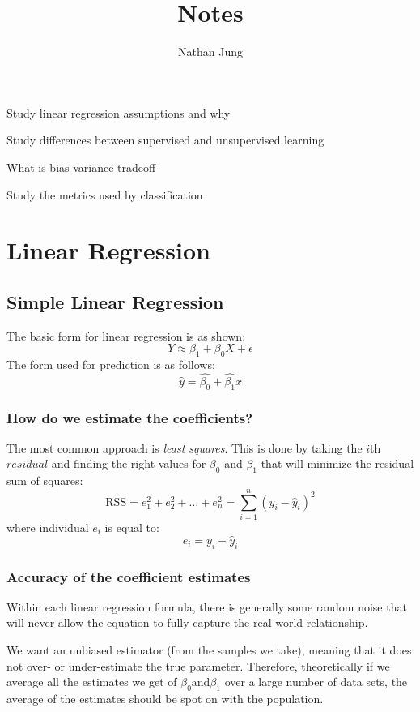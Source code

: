 \documentclass[12pt]{article}
\title{Notes}
\author{Nathan Jung}
\begin{document}
\maketitle

Study linear regression assumptions and why 

Study differences between supervised and unsupervised learning

What is bias-variance tradeoff

Study the metrics used by classification
   


\section{Linear Regression}
\subsection{Simple Linear Regression}
The basic form for linear regression is as shown:
\[ Y \approx  \beta_1 + \beta_0X + \epsilon \]
The form used for prediction is as follows:
\[ \hat{y} = \hat{\beta_0} + \hat{\beta_1}x \]

\subsubsection{How do we estimate the coefficients?}
The most common approach is \textit{least squares}. This is done by taking the $i$th $residual$ and finding the right values for $\beta_0$ and $\beta_1$ that will minimize the residual sum of squares:
\[ \text{RSS} = e^2_1 + e^2_2 + \ldots + e^2_n = \sum_{i = 1}^n{(y_i - \hat{y}_i)^2} \]
where individual $e_i$ is equal to:
\[e_i = y_i - \hat{y}_i\]

\subsubsection{Accuracy of the coefficient estimates}
Within each linear regression formula, there is generally some random noise that will never allow the equation to fully capture the real world relationship. 

We want an unbiased estimator (from the samples we take), meaning that it does not over- or under-estimate the true parameter. Therefore, theoretically if we average all the estimates we get of $\beta_0 \text{and} \beta_1$ over a large number of data sets, the average of the estimates should be spot on with the population. 
\end{document}
